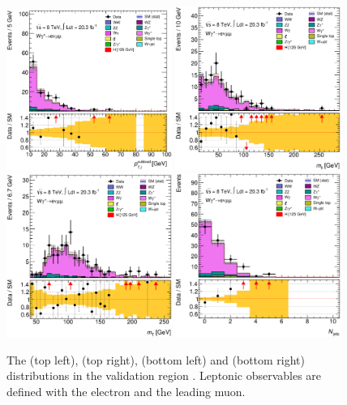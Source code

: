 \begin{figure}[t]
	\includegraphics[width=0.48\textwidth]{tex/backgrounds/Wgstar/em_CutDPhiMax_lepPtSublead_zoom_mh125_lin}
	\hfill
	\includegraphics[width=0.48\textwidth]{tex/backgrounds/Wgstar/em_CutDPhiMax_Mll_mh125_lin}
	\\
	\includegraphics[width=0.48\textwidth]{tex/backgrounds/Wgstar/em_CutDPhiMax_MT_TrackHWW_Clj_mh125_lin}
	\hfill
	\includegraphics[width=0.48\textwidth]{tex/backgrounds/Wgstar/em_CutDPhiMax_m_jet_n_mh125_lin}
	\caption{The \ptsubleadlep (top left), \mll (top right), \mt (bottom left) and \njets 
	(bottom right) distributions in the \Wgstar validation region \cite{BackgroundNote}. 
	Leptonic observables are defined with the electron and the leading muon.}
	\label{fig:wgstar:vr}
\end{figure}

